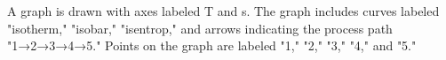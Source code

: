 A graph is drawn with axes labeled T and s. The graph includes curves labeled "isotherm," "isobar," "isentrop," and arrows indicating the process path "1→2→3→4→5." Points on the graph are labeled "1," "2," "3," "4," and "5."